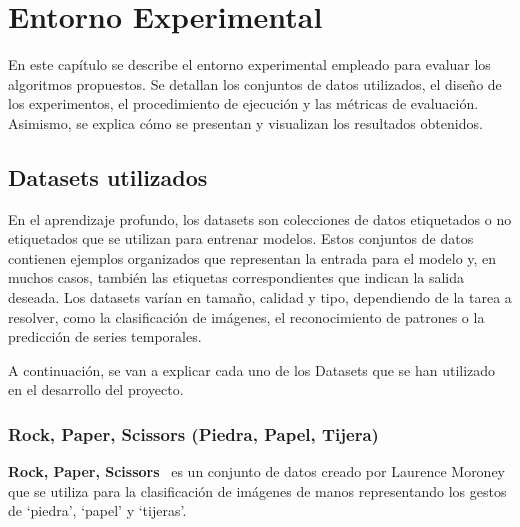 
\chapter{Entorno Experimental}\label{ch:entorno-experimental}
En este capítulo se describe el entorno experimental empleado para evaluar los algoritmos propuestos.
Se detallan los conjuntos de datos utilizados, el diseño de los experimentos, el procedimiento de ejecución y las métricas de evaluación.
Asimismo, se explica cómo se presentan y visualizan los resultados obtenidos.


\section{Datasets utilizados}\label{sec:datasets}
En el aprendizaje profundo, los datasets son colecciones de datos etiquetados o no etiquetados que se utilizan para
entrenar modelos.
Estos conjuntos de datos contienen ejemplos organizados que representan la entrada para el modelo y, en muchos casos,
también las etiquetas correspondientes que indican la salida deseada.
Los datasets varían en tamaño, calidad y tipo, dependiendo de la tarea a resolver, como la clasificación de imágenes,
el reconocimiento de patrones o la predicción de series temporales.


A continuación, se van a explicar cada uno de los Datasets que se han utilizado en el desarrollo del proyecto.

\subsection{Rock, Paper, Scissors (Piedra, Papel, Tijera)}\label{subsec:rock-paper-scissors}
\textbf{Rock, Paper, Scissors}~\cite{RockPaperScissors} es un conjunto de datos creado por Laurence Moroney
que se utiliza para la clasificación de imágenes de manos representando los gestos de `piedra', `papel' y `tijeras'.

